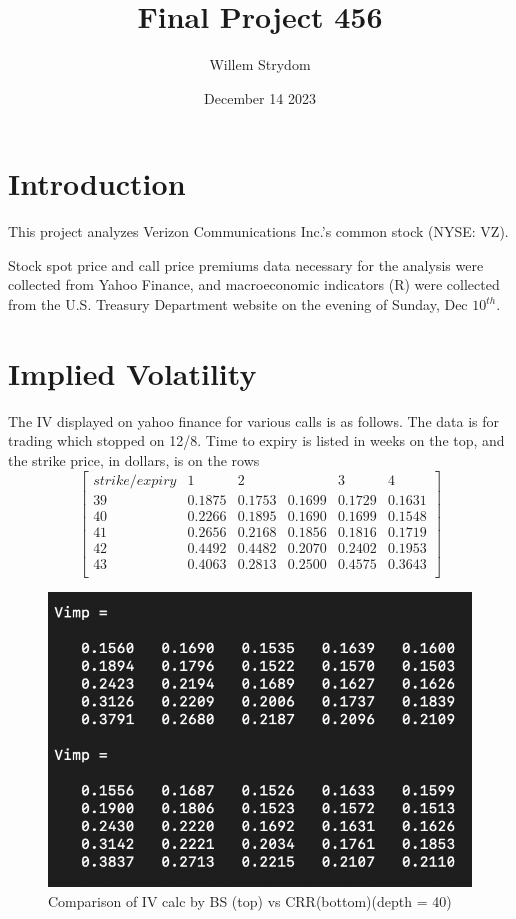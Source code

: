 \documentclass{article}
\title{Final Project 456}
\author{Willem Strydom }
\date{December 14 2023}
\begin{document}
\maketitle

\section{Introduction}
This project analyzes Verizon Communications Inc.'s common stock (NYSE: VZ).

Stock spot price and call price premiums data necessary for the analysis were collected from Yahoo Finance, and macroeconomic indicators (R) were collected from the U.S. Treasury Department website on the evening of Sunday, Dec $10^{th}$.

\section{Implied Volatility}
The IV displayed on yahoo finance for various calls is as follows. The data is for trading which stopped on 12/8. Time to expiry is listed in weeks on the top, and the strike price, in dollars, is on the rows
\FloatBarrier
$$
\begin{bmatrix}
strike/expiry& 1 & 2 &  & 3 & 4\\
39&0.1875 & 0.1753 & 0.1699 & 0.1729 & 0.1631\\
40&0.2266 & 0.1895 & 0.1690 & 0.1699 & 0.1548\\
41&0.2656 & 0.2168 & 0.1856 & 0.1816 & 0.1719\\
42&0.4492 & 0.4482 & 0.2070 & 0.2402 & 0.1953\\
43&0.4063 & 0.2813 & 0.2500 & 0.4575 & 0.3643\\
\end{bmatrix}
$$
\begin{figure}
    \centering
    \includegraphics[width=0.8\linewidth]{crrvsbs.png}
    \caption{Comparison of IV calc by BS (top) vs CRR(bottom)(depth = 40)}
    \label{IV comparison of bs (top) vs crr(bottom)}
\end{figure}
\end{document}
